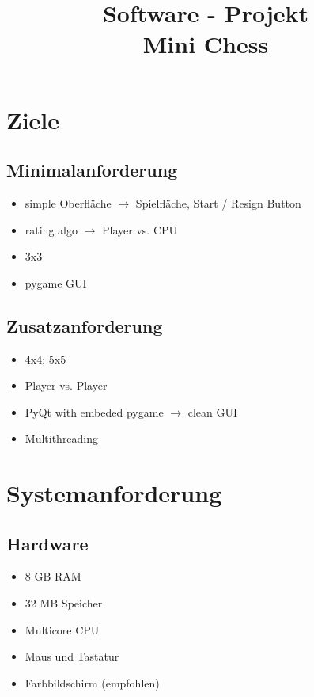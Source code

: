 \documentclass{article}
\title{\textbf{Software - Projekt\\Mini Chess}}
\date{\vspace{-5ex}}
\begin{document}
\maketitle
\thispagestyle{fancy}


\tableofcontents
\newpage


\section{Ziele}\label{section-goals}

\subsection{Minimalanforderung}
\begin{itemize}
    \item simple Oberfläche $\rightarrow$ Spielfläche, Start / Resign Button
    \item rating algo $\rightarrow$ Player vs. CPU
    \item 3x3
    \item pygame GUI
\end{itemize}

\subsection{Zusatzanforderung}
\begin{itemize}
    \item 4x4; 5x5
    \item Player vs. Player
    \item PyQt with embeded pygame $\rightarrow$ clean GUI
    \item Multithreading
\end{itemize}


\newpage
\section{Systemanforderung}\label{section-requirements}

\subsection{Hardware}
\begin{itemize}
    \item 8 GB RAM
    \item 32 MB Speicher
    \item Multicore CPU
    \item Maus und Tastatur
    \item Farbbildschirm (empfohlen)
\end{itemize}
\end{document}
